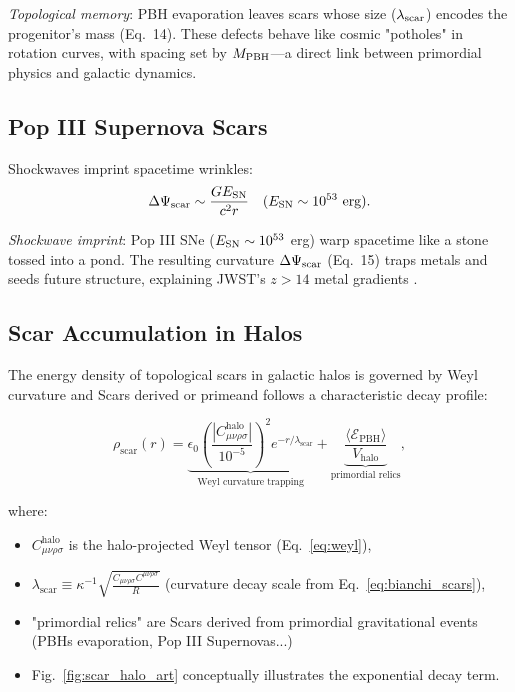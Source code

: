 \documentclass{article}
\begin{document}
\textit{Topological memory}: PBH evaporation leaves scars whose size ($\lambda_{\rm scar}$) encodes the progenitor's mass (Eq.~14). These defects behave like cosmic "potholes" in rotation curves, with spacing set by $M_{\rm PBH}$—a direct link between primordial physics and galactic dynamics.  

\subsection{Pop III Supernova Scars}  
Shockwaves imprint spacetime wrinkles:  
\begin{equation}  
\Delta \Psi_{\rm scar} \sim \frac{G E_{\rm SN}}{c^2 r} \quad (E_{\rm SN} \sim 10^{53} \text{ erg}).  
\end{equation}  

\textit{Shockwave imprint}: Pop III SNe ($E_{\rm SN} \sim 10^{53}$ erg) warp spacetime like a stone tossed into a pond. The resulting curvature $\Delta\Psi_{\rm scar}$ (Eq.~15) traps metals and seeds future structure, explaining JWST's $z>14$ metal gradients \cite{JADES2025}.  

\subsection{Scar Accumulation in Halos}
\label{subsec:scar_halo}

The energy density of topological scars in galactic halos is governed by Weyl curvature and Scars derived or primeand follows a characteristic decay profile:

\begin{equation}
\rho_{\text{scar}}(r) = \underbrace{\epsilon_0 \left(\frac{|C^{\text{halo}}_{\mu\nu\rho\sigma}|}{10^{-5}}\right)^2 e^{-r/\lambda_{\text{scar}}}}_{\text{Weyl curvature trapping}} + \underbrace{\frac{\langle \mathcal{E}_{\text{PBH}} \rangle}{V_{\text{halo}}}}_{\text{primordial relics}},
\label{eq:weyl_halo}
\end{equation}

where:
\begin{itemize}
    \item $C^{\text{halo}}_{\mu\nu\rho\sigma}$ is the halo-projected Weyl tensor (Eq.~\ref{eq:weyl}),
    \item $\lambda_{\text{scar}} \equiv \kappa^{-1} \sqrt{\frac{C_{\mu\nu\rho\sigma}C^{\mu\nu\rho\sigma}}{R}}$ (curvature decay scale from Eq.~\ref{eq:bianchi_scars}),
    \item "primordial relics" are Scars derived from primordial gravitational events (PBHs evaporation,  Pop III Supernovas...)
    \item Fig.~\ref{fig:scar_halo_art} conceptually illustrates the exponential decay term.
\end{itemize}
\end{document}
